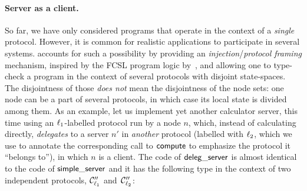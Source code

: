 \begin{wrapfigure}[6]{h}{0.44\textwidth}
\vspace{-10pt}
\end{wrapfigure}
%
\paragraph{Server as a client.}

So far, we have only considered programs that operate in the context
of a \emph{single} protocol. However, it is common for realistic
applications to participate in several systems.  \disel accounts for
such a possibility by providing an \emph{injection}/\emph{protocol
  framing} mechanism, inspired by the FCSL program
logic by~\citet{Nanevski-al:ESOP14}, and allowing one to type-check a
program in the context of several protocols with disjoint
state-spaces.
%
The disjointness of those \emph{does not} mean the
disjointness of the node sets: one node can be a part of several
protocols, in which case its local state is divided among them.
%
As an example, let us implement yet another calculator server, this
time using an $\ell_1$-labelled protocol run by a node $n$, which,
instead of calculating directly, \emph{delegates} to a server $n'$ in
\emph{another} protocol (labelled with $\ell_2$, which we use to
annotate the corresponding call to $\mathsf{compute}$ to emphasize the
protocol it ``belongs to''), in which $n$ is a client.
%
%
The code of $\mathsf{deleg\_server}$ is almost identical to the code of $\mathsf{simple\_server}$
and it has the following type in the context of two independent
protocols, $\mathcal{C}''_{\ell_1}$ and~$\mathcal{C}''_{\ell_2}$:
%
%

